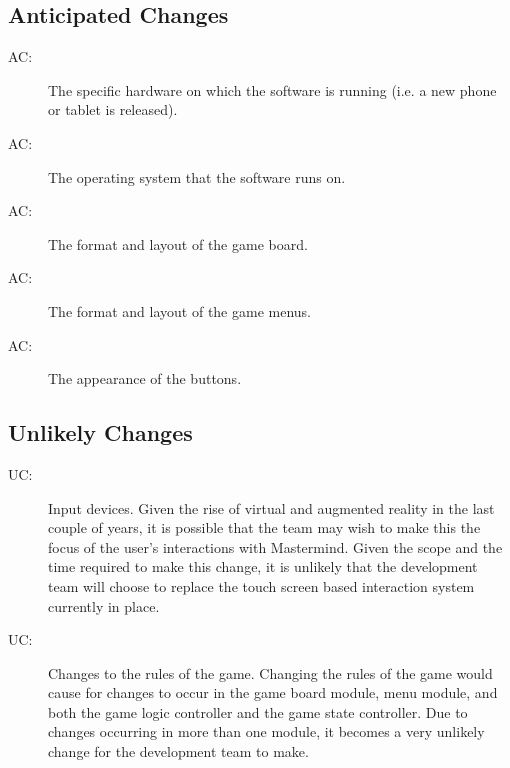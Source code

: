 \documentclass[12pt, titlepage]{article}
\newcounter{acnum}
\newcommand{\actheacnum}{AC\theacnum}
\newcounter{ucnum}
\newcommand{\uctheucnum}{UC\theucnum}
\begin{document}
\subsection{Anticipated Changes} \label{SecAchange}

\begin{description}
\item[ \actheacnum \label{ac1}:] The specific
  hardware on which the software is running (i.e. a new phone or tablet is released).
\item[ \actheacnum \label{ac2}:] The operating system that the software runs on.
\item[ \actheacnum \label{ac3}:] The format and layout of the game board.
\item[ \actheacnum \label{ac4}:] The format and layout of the game menus.
\item[ \actheacnum \label{ac5}:] The appearance of the buttons.
\end{description}

\subsection{Unlikely Changes} \label{SecUchange}


\begin{description}
\item[ \uctheucnum \label{ucIO}:] Input devices. Given the rise of virtual and augmented reality in the last couple of years, it is possible that the team may wish to make this the focus of the user's interactions with Mastermind. Given the scope and the time required to make this change, it is unlikely that the development team will choose to replace the touch screen based interaction system currently in place.
\item[ \uctheucnum \label{ucChangeRules}:] Changes to the rules of the game. Changing the rules of the game would cause for changes to occur in the game board module, menu module, and both the game logic controller and the game state controller. Due to changes occurring in more than one module, it becomes a very unlikely change for the development team to make.
\end{description}
\end{document}
